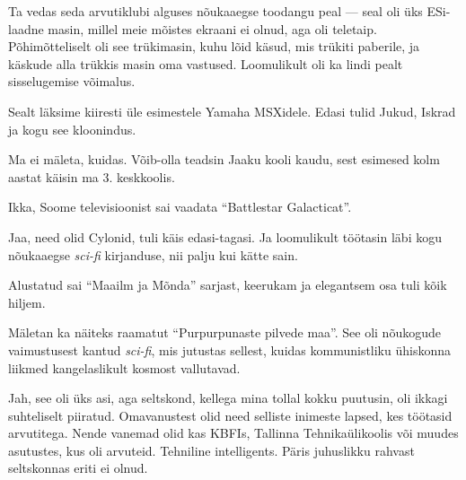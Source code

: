 Ta vedas seda arvutiklubi alguses nõukaaegse toodangu peal --- seal oli üks
ESi-laadne masin, millel meie mõistes ekraani ei olnud, aga oli teletaip. 
Põhimõtteliselt oli see trükimasin, kuhu lõid käsud, mis trükiti 
paberile, ja käskude alla trükkis masin oma vastused. Loomulikult oli ka lindi pealt sisselugemise võimalus.

Sealt läksime kiiresti üle esimestele Yamaha 
MSXidele. Edasi tulid Jukud, 
Iskrad ja kogu see kloonindus.


Ma ei mäleta, kuidas. Võib-olla teadsin Jaaku kooli kaudu, sest esimesed kolm aastat käisin ma 3. keskkoolis.


Ikka, Soome televisioonist sai vaadata \enquote{Battlestar Galacticat}.


Jaa, need olid Cylonid, tuli käis edasi-tagasi. Ja loomulikult töötasin läbi kogu nõukaaegse 
\emph{sci-fi} kirjanduse, nii palju kui kätte sain.


Alustatud sai \enquote{Maailm ja Mõnda} sarjast, keerukam ja elegantsem osa tuli kõik hiljem. 

Mäletan ka näiteks raamatut \enquote{Purpurpunaste pilvede 
maa}. See oli nõukogude vaimustusest 
kantud \emph{sci-fi}, mis jutustas sellest, kuidas kommunistliku ühiskonna liikmed 
kangelaslikult kosmost vallutavad.


Jah, see oli üks asi, aga seltskond, kellega mina tollal kokku puutusin, oli 
ikkagi suhteliselt piiratud. Omavanustest olid need selliste inimeste 
lapsed, kes töötasid arvutitega. Nende vanemad olid kas 
KBFIs, Tallinna Tehnikaülikoolis või muudes asutustes, kus oli arvuteid. 
Tehniline intelligents. Päris juhuslikku rahvast seltskonnas eriti ei 
olnud.

